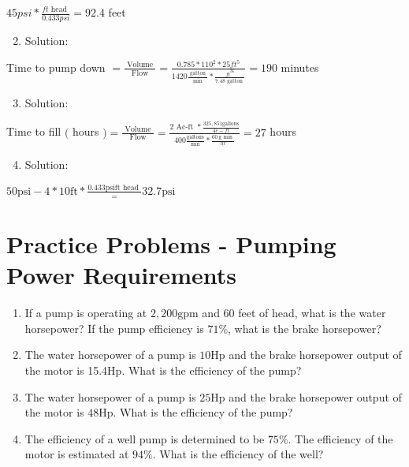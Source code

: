 \documentclass[10pt]{article}
\begin{document}
\begin{enumerate}
\begin{enumerate}
$45 p s i * \frac{f t \text { head }}{0.433 p s i}=92.4$ feet

\begin{enumerate}
  \setcounter{enumi}{1}
  \item Solution:
\end{enumerate}

Time to pump down $=\frac{\text { Volume }}{\text { Flow }}=\frac{0.785 * 110^{2} * 25 f t^{5}}{1420 \frac{\text { gatton }}{\text { min }} * \frac{f t^{36}}{7.48 \text { gatton }}}=190$ minutes

\begin{enumerate}
  \setcounter{enumi}{2}
  \item Solution:
\end{enumerate}

Time to fill $($ hours $)=\frac{\text { Volume }}{\text { Flow }}=\frac{2 \text { Ac-ft } * \frac{325,851 \mathrm{gallons}}{4 c-f t}}{400 \frac{\mathrm{galtons}}{\mathrm{min}} * \frac{60 \mathrm{~g} \text { min }}{h r}}=27$ hours

\begin{enumerate}
  \setcounter{enumi}{3}
  \item Solution:
\end{enumerate}

$50 \mathrm{psi}-4 * 10 \mathrm{ft} * \frac{0.433 \mathrm{psift} \text { head }}{=} 32.7 \mathrm{psi}$

\section{Practice Problems - Pumping Power Requirements}
\begin{enumerate}
  \item If a pump is operating at $2,200 \mathrm{gpm}$ and 60 feet of head, what is the water horsepower? If the pump efficiency is $71 \%$, what is the brake horsepower?

  \item The water horsepower of a pump is $10 \mathrm{Hp}$ and the brake horsepower output of the motor is 15.4Hp. What is the efficiency of the pump?

  \item The water horsepower of a pump is $25 \mathrm{Hp}$ and the brake horsepower output of the motor is $48 \mathrm{Hp}$. What is the efficiency of the pump?

  \item The efficiency of a well pump is determined to be $75 \%$. The efficiency of the motor is estimated at $94 \%$. What is the efficiency of the well?


\end{enumerate}
\end{enumerate}
\end{enumerate}
\end{document}
